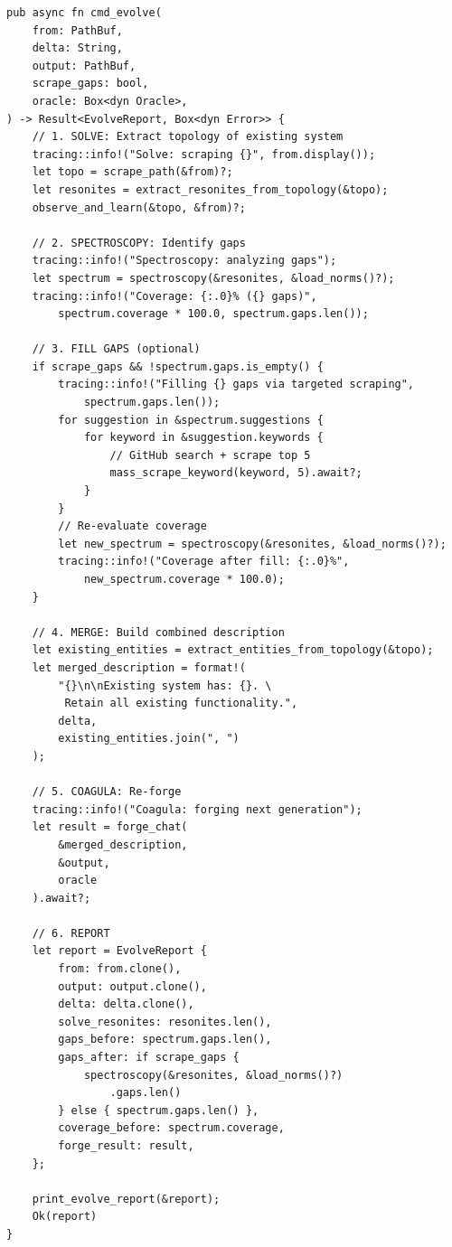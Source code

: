 \documentclass[11pt,a4paper]{article}
\begin{document}
\begin{lstlisting}[style=rust]
pub async fn cmd_evolve(
    from: PathBuf,
    delta: String,
    output: PathBuf,
    scrape_gaps: bool,
    oracle: Box<dyn Oracle>,
) -> Result<EvolveReport, Box<dyn Error>> {
    // 1. SOLVE: Extract topology of existing system
    tracing::info!("Solve: scraping {}", from.display());
    let topo = scrape_path(&from)?;
    let resonites = extract_resonites_from_topology(&topo);
    observe_and_learn(&topo, &from)?;
    
    // 2. SPECTROSCOPY: Identify gaps
    tracing::info!("Spectroscopy: analyzing gaps");
    let spectrum = spectroscopy(&resonites, &load_norms()?);
    tracing::info!("Coverage: {:.0}% ({} gaps)", 
        spectrum.coverage * 100.0, spectrum.gaps.len());
    
    // 3. FILL GAPS (optional)
    if scrape_gaps && !spectrum.gaps.is_empty() {
        tracing::info!("Filling {} gaps via targeted scraping", 
            spectrum.gaps.len());
        for suggestion in &spectrum.suggestions {
            for keyword in &suggestion.keywords {
                // GitHub search + scrape top 5
                mass_scrape_keyword(keyword, 5).await?;
            }
        }
        // Re-evaluate coverage
        let new_spectrum = spectroscopy(&resonites, &load_norms()?);
        tracing::info!("Coverage after fill: {:.0}%", 
            new_spectrum.coverage * 100.0);
    }
    
    // 4. MERGE: Build combined description
    let existing_entities = extract_entities_from_topology(&topo);
    let merged_description = format!(
        "{}\n\nExisting system has: {}. \
         Retain all existing functionality.",
        delta,
        existing_entities.join(", ")
    );
    
    // 5. COAGULA: Re-forge
    tracing::info!("Coagula: forging next generation");
    let result = forge_chat(
        &merged_description, 
        &output, 
        oracle
    ).await?;
    
    // 6. REPORT
    let report = EvolveReport {
        from: from.clone(),
        output: output.clone(),
        delta: delta.clone(),
        solve_resonites: resonites.len(),
        gaps_before: spectrum.gaps.len(),
        gaps_after: if scrape_gaps { 
            spectroscopy(&resonites, &load_norms()?)
                .gaps.len() 
        } else { spectrum.gaps.len() },
        coverage_before: spectrum.coverage,
        forge_result: result,
    };
    
    print_evolve_report(&report);
    Ok(report)
}
\end{lstlisting}
\end{document}

